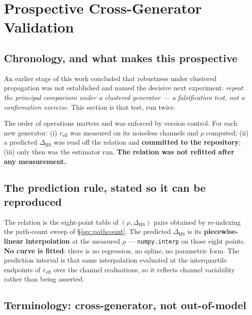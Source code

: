 \documentclass[journal]{IEEEtran}
\newcommand{\reff}{r_{\mathrm{eff}}}
\newcommand{\dhs}{\Delta_{\mathrm{HS}}}
\begin{document}
\section{Prospective Cross-Generator Validation}\label{sec:crossgen}

\subsection{Chronology, and what makes this prospective}

An earlier stage of this work concluded that robustness under clustered
propagation was not established and named the decisive next experiment:
\emph{repeat the principal comparison under a clustered generator --- a
falsification test, not a confirmation exercise.} This section is that test,
run twice.

The order of operations matters and was enforced by version control. For each
new generator: (i) $\reff$ was measured on its noiseless channels and $\rho$
computed; (ii) a predicted $\dhs$ was read off the relation and
\textbf{committed to the repository}; (iii) only then was the estimator run.
\textbf{The relation was not refitted after any measurement.}

\subsection{The prediction rule, stated so it can be reproduced}

The relation is the eight-point table of $(\rho,\dhs)$ pairs obtained by
re-indexing the path-count sweep of \S\ref{sec:pathcount}. The predicted
$\dhs$ is its \textbf{piecewise-linear interpolation} at the measured $\rho$
--- \texttt{numpy.interp} on those eight points.
\textbf{No curve is fitted}: there is no regression, no spline, no parametric
form. The prediction interval is that same interpolation evaluated at the
interquartile endpoints of $\reff$ over the channel realisations, so it
reflects channel variability rather than being asserted.

\subsection{Terminology: cross-generator, not out-of-model}
\end{document}

